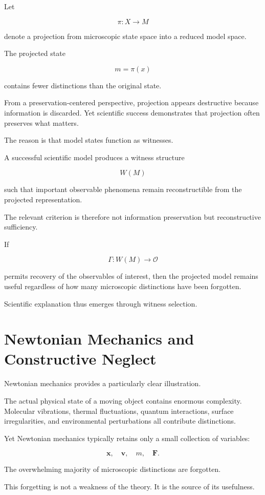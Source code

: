 \documentclass[12pt,oneside]{book}
\theoremstyle{plain} \newtheorem{theorem}{Theorem}[chapter] \newtheorem{lemma}[theorem]{Lemma} \newtheorem{proposition}[theorem]{Proposition} \newtheorem{corollary}[theorem]{Corollary}
\theoremstyle{definition} \newtheorem{definition}[theorem]{Definition} \newtheorem{axiom}[theorem]{Axiom} \newtheorem{construction}[theorem]{Construction}
\theoremstyle{remark} \newtheorem{remark}[theorem]{Remark} \newtheorem{example}[theorem]{Example}
\begin{document}
Let

\[
\pi
:
X
\rightarrow
M
\]

denote a projection from microscopic state space into a reduced model space.

The projected state

\[
m=\pi(x)
\]

contains fewer distinctions than the original state.

From a preservation-centered perspective, projection appears destructive because information is discarded. Yet scientific success demonstrates that projection often preserves what matters.

The reason is that model states function as witnesses.

A successful scientific model produces a witness structure

\[
W(M)
\]

such that important observable phenomena remain reconstructible from the projected representation.

The relevant criterion is therefore not information preservation but reconstructive sufficiency.

If

\[
\Gamma
:
W(M)
\rightarrow
\mathcal O
\]

permits recovery of the observables of interest, then the projected model remains useful regardless of how many microscopic distinctions have been forgotten.

Scientific explanation thus emerges through witness selection.

\section{Newtonian Mechanics and Constructive Neglect}

Newtonian mechanics provides a particularly clear illustration.

The actual physical state of a moving object contains enormous complexity. Molecular vibrations, thermal fluctuations, quantum interactions, surface irregularities, and environmental perturbations all contribute distinctions.

Yet Newtonian mechanics typically retains only a small collection of variables:

\[
\mathbf x,
\quad
\mathbf v,
\quad
m,
\quad
\mathbf F.
\]

The overwhelming majority of microscopic distinctions are forgotten.

This forgetting is not a weakness of the theory. It is the source of its usefulness.
\end{document}
